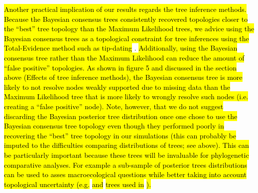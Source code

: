 \documentclass[12pt,letterpaper]{article}
\begin{document}
\hl{Another practical implication of our results regards the tree inference methods.
Because the Bayesian consensus trees consistently recovered topologies closer to the ``best'' tree topology than the Maximum Likelihood trees, we advice using the Bayesian consensus trees as a topological constraint for tree inferences using the Total-Evidence method such as tip-dating} \citep[\hl{e.g.}][\hl{; although it is possible that including dating information during tree inference could also improve the accuracy of the Bayesian posterior tree distribution}]{ronquista2012,Wood01032013,BEASTmaster}.
\hl{Additionally, using the Bayesian consensus tree rather than the Maximum Likelihood can reduce the amount of ``false positive'' topologies.
As shown in figure 5 and discussed in the section above (Effects of tree inference methods), the Bayesian consensus tree is more likely to not resolve nodes weakly supported due to missing data than the Maximum Likelihood tree that is more likely to wrongly resolve such nodes (i.e. creating a ``false positive'' node).
Note, however, that we do not suggest discarding the Bayesian posterior tree distribution once one chose to use the Bayesian consensus tree topology even though they performed poorly in recovering the ``best'' tree topology in our simulations (this can probably be imputed to the difficulties comparing distributions of trees; see above).
This can be particularly important because these trees will be invaluable for phylogenetic comparative analyses.
For example a sub-sample of posterior trees distributions can be used to asses macroecological questions while better taking into account topological uncertainty (e.g. }\citealt{FritzTree}\hl{ and }\citealt{jetzthe2012}\hl{ trees used in }\citealt{healy2014}\hl{).}
\end{document}
